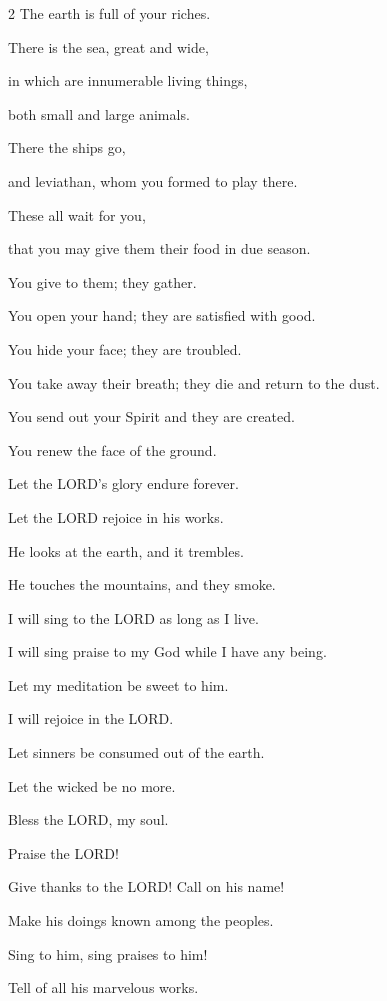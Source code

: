 \begin{multicols}{2}
	The earth is full of your riches.
	
	
	\myverse{}There is the sea, great and wide,
	
	in which are innumerable living things,
	
	both small and large animals.
	
	
	\myverse{}There the ships go,
	
	and leviathan, whom you formed to play there.
	
	
	\myverse{}These all wait for you,
	
	that you may give them their food in due season.
	
	
	\myverse{}You give to them; they gather.
	
	You open your hand; they are satisfied with good.
	
	
	\myverse{}You hide your face; they are troubled.
	
	You take away their breath; they die and return to the dust.
	
	
	\myverse{}You send out your Spirit and they are created.
	
	You renew the face of the ground.
	
	
	\myverse{}Let the LORD’s glory endure forever.
	
	Let the LORD rejoice in his works.
	
	
	\myverse{}He looks at the earth, and it trembles.
	
	He touches the mountains, and they smoke.
	
	
	\myverse{}I will sing to the LORD as long as I live.
	
	I will sing praise to my God while I have any being.
	
	
	\myverse{}Let my meditation be sweet to him.
	
	I will rejoice in the LORD.
	
	
	\myverse{}Let sinners be consumed out of the earth.
	
	Let the wicked be no more.
	
	Bless the LORD, my soul.
	
	Praise the LORD!
	
	
	\mychapter{} \myverse*{}Give thanks to the LORD! Call on his name!
	
	\quad\quad\quad Make his doings known among the peoples.
	
	
	\myverse{}Sing to him, sing praises to him!
	
	Tell of all his marvelous works.
	

\end{multicols}
